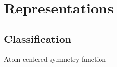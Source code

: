 
\section{Representations}
\subsection{Classification}
% 




% 
% 
\begin{frame}{Atom-centered symmetry function}
%
\end{frame}

